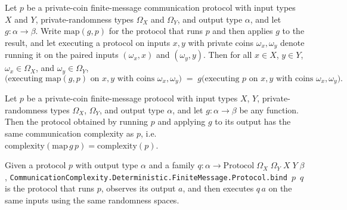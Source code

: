 \begin{theorem}
\label{CommunicationComplexity.PrivateCoin.FiniteMessage.Protocol.map_rrun}
\leanok
{}
Let $p$ be a private-coin finite-message communication protocol with input types $X$ and
$Y$, private-randomness types $\Omega_X$ and $\Omega_Y$, and output type $\alpha$, and
let $g \colon \alpha \to \beta$. Write $\mathrm{map}(g, p)$ for the protocol that runs
$p$ and then applies $g$ to the result, and let executing a protocol on inputs $x, y$
with private coins $\omega_x, \omega_y$ denote running it on the paired inputs
$(\omega_x, x)$ and $(\omega_y, y)$. Then for all $x \in X$, $y \in Y$, $\omega_x \in
\Omega_X$, and $\omega_y \in \Omega_Y$,
\[
\bigl(\text{executing } \mathrm{map}(g, p) \text{ on } x, y \text{ with coins }
\omega_x, \omega_y\bigr)
  \;=\;
g\bigl(\text{executing } p \text{ on } x, y \text{ with coins } \omega_x,
\omega_y\bigr).
\]
\end{theorem}

\begin{theorem}
\label{CommunicationComplexity.PrivateCoin.FiniteMessage.Protocol.map_complexity}
\leanok
{}
Let $p$ be a private-coin finite-message protocol with input types $X$, $Y$,
private-randomness types $\Omega_X$, $\Omega_Y$, and output type $\alpha$, and let $g
\colon \alpha \to \beta$ be any function. Then the protocol obtained by running $p$ and
applying $g$ to its output has the same communication complexity as $p$, i.e.
$\mathrm{complexity}(\mathrm{map}\,g\,p) = \mathrm{complexity}(p)$.
\end{theorem}

\begin{definition}
\label{CommunicationComplexity.PrivateCoin.FiniteMessage.Protocol.bind}
\leanok
{}
Given a protocol $p$ with output type $\alpha$ and a family $q : \alpha \to \mathrm{Protocol}\;\Omega_X\;\Omega_Y\;X\;Y\;\beta$,
\texttt{CommunicationComplexity.Deterministic.FiniteMessage.Protocol.bind}~$p$~$q$ is the protocol that runs $p$, observes its output $a$, and then
executes $q\,a$ on the same inputs using the same randomness spaces.
\end{definition}

